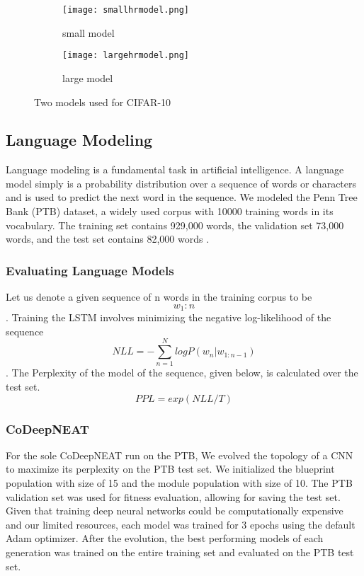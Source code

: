 \documentclass[11pt]{article}
\begin{document}
\begin{figure}[h]
\begin{subfigure}{0.4\textwidth}
\texttt{[image: smallhrmodel.png]} 
\caption{small model}
\label{fig:small}
\end{subfigure}
\begin{subfigure}{0.5\textwidth}
\texttt{[image: largehrmodel.png]}
\caption{large model}
\label{fig:large}
\end{subfigure}
\caption{Two models used for CIFAR-10 \cite{hierarchical}}
\label{fig:models}
\end{figure}

\subsection{Language Modeling}
Language modeling is a fundamental task in artificial intelligence. A language model simply is a probability distribution over a sequence of words or characters and is used to predict the next word in the sequence. We modeled the Penn Tree Bank (PTB) dataset, a widely used corpus with 10000 training words in its vocabulary. The training set contains 929,000 words, the validation set 73,000 words, and the test set contains 82,000 words \cite{nlp}.

\subsubsection{Evaluating Language Models}
Let us denote a given sequence of n words in the training corpus to be \[ w_1:n\]. Training the LSTM involves minimizing the negative log-likelihood of the sequence \[ NLL = -\sum_{n = 1}^{N}log   P(w_n |w_{1:n-1})\]. The Perplexity of the model of the sequence, given below, is calculated over the test set. \cite{nlp}  \[PPL = exp(NLL/T) \] 

\subsubsection{CoDeepNEAT}
For the sole CoDeepNEAT run on the PTB, We evolved the topology of a CNN to maximize its perplexity on the PTB test set. We initialized the blueprint population with size of 15 and the module population with size of 10. The PTB validation set was used for fitness evaluation, allowing for saving the test set. Given that training deep neural networks could be computationally expensive and our limited resources, each model was trained for 3 epochs using the default Adam optimizer. After the evolution, the best performing models of each generation was trained on the entire training set and evaluated on the PTB test set. 
\end{document}
